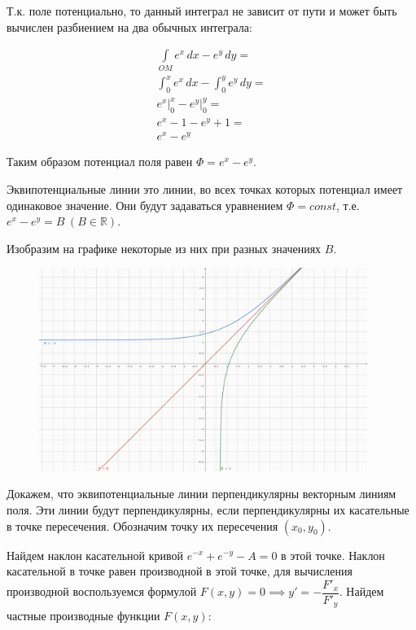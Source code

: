 Т.к. поле потенциально, то данный интеграл не зависит от пути и может быть
вычислен разбиением на два обычных интеграла:

\begin{equation*}\begin{split}
    \int\limits_{OM} e^x \,dx - e^y \,dy = \\
    \int_0^x e^x\,dx - \int_0^y e^y\,dy = \\
    e^x \bigg\vert_0^x - e^y \bigg\vert_0^y = \\
    e^x - 1 - e^y + 1 = \\
    e^x - e^y
  \end{split}\end{equation*}

Таким образом потенциал поля равен \(\Phi = e^x - e^y\).

\bigskip

Эквипотенциальные линии это линии, во всех точках которых потенциал имеет
одинаковое значение. Они будут задаваться уравнением \(\Phi = const\), т.е.
\(e^x - e^y = B \hspace{3pt} (B \in \mathbb{R})\).

Изобразим на графике некоторые из них при разных значениях \(B\).

\begin{figure}[!htbp]
  \centering
  \includegraphics[width=0.95\textwidth]{images/t02_p02.png}
\end{figure}

\bigskip

Докажем, что эквипотенциальные линии перпендикулярны векторным линиям поля. Эти
линии будут перпендикулярны, если перпендикулярны их касательные в точке
пересечения. Обозначим точку их пересечения \((x_0, y_0)\).

Найдем наклон касательной кривой \(e^{-x} + e^{-y} - A = 0\) в этой точке.
Наклон касательной в точке равен производной в этой точке, для вычисления
производной воспользуемся формулой
\(F(x, y) = 0 \implies y' = -\dfrac{F'_x}{F'_y}\). Найдем частные производные
функции \(F(x, y)\):

